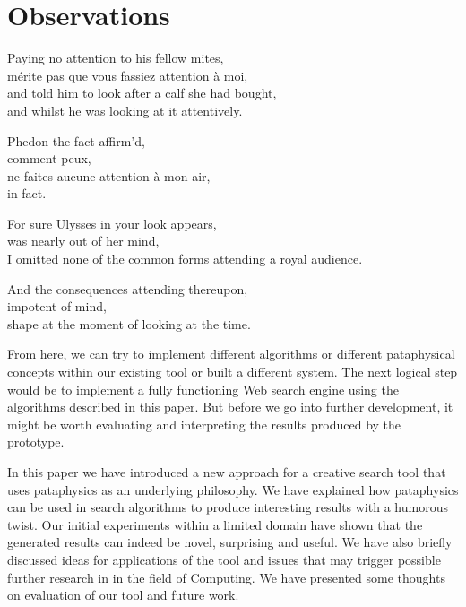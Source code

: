 
\chapter{Observations}
\label{ch:observations}

\startcontents[chapters]

\vfill

Paying no attention to his fellow mites, \\
mérite pas que vous fassiez attention à moi, \\
and told him to look after a calf she had bought, \\
and whilst he was looking at it attentively.

Phedon the fact affirm'd, \\
comment peux, \\
ne faites aucune attention à mon air, \\
in fact.

For sure Ulysses in your look appears, \\
was nearly out of her mind, \\
I omitted none of the common forms attending a royal audience.

And the consequences attending thereupon, \\
impotent of mind, \\
shape at the moment of looking at the time.

\newpage
\minicontents
\spirals

From here, we can try to implement different algorithms or different pataphysical concepts within our existing tool or built a different system. The next logical step would be to implement a fully functioning Web search engine using the algorithms described in this paper. But before we go into further development, it might be worth evaluating and interpreting the results produced by the prototype.

In this paper we have introduced a new approach for a creative search tool that uses pataphysics as an underlying philosophy.  We have explained how pataphysics can be used in search algorithms to produce interesting results with a humorous twist. Our initial experiments within a limited domain have shown that the generated results can indeed be novel, surprising and useful. We have also briefly discussed ideas for applications of the tool and issues that may trigger possible further research in in the field of Computing. We have presented some thoughts on evaluation of our tool and future work.

